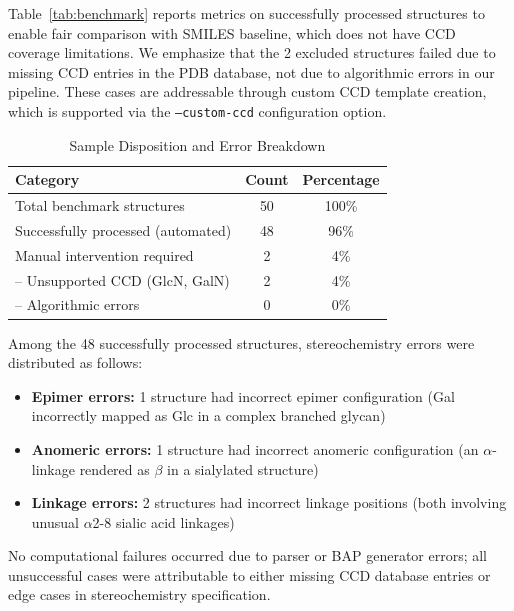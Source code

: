 Table~\ref{tab:benchmark} reports metrics on successfully processed structures to enable fair comparison with SMILES baseline, which does not have CCD coverage limitations. We emphasize that the 2 excluded structures failed due to missing CCD entries in the PDB database, not due to algorithmic errors in our pipeline. These cases are addressable through custom CCD template creation, which is supported via the \texttt{--custom-ccd} configuration option.

\begin{table}[htbp]
\centering
\caption{Sample Disposition and Error Breakdown}
\label{tab:disposition}
\begin{tabular}{lcc}
\toprule
Category & Count & Percentage \\
\midrule
Total benchmark structures & 50 & 100\% \\
Successfully processed (automated) & 48 & 96\% \\
Manual intervention required & 2 & 4\% \\
\quad -- Unsupported CCD (GlcN, GalN) & 2 & 4\% \\
\quad -- Algorithmic errors & 0 & 0\% \\
\bottomrule
\end{tabular}
\end{table}

Among the 48 successfully processed structures, stereochemistry errors were distributed as follows:
\begin{itemize}
\item \textbf{Epimer errors:} 1 structure had incorrect epimer configuration (Gal incorrectly mapped as Glc in a complex branched glycan)
\item \textbf{Anomeric errors:} 1 structure had incorrect anomeric configuration (an $\alpha$-linkage rendered as $\beta$ in a sialylated structure)
\item \textbf{Linkage errors:} 2 structures had incorrect linkage positions (both involving unusual $\alpha$2-8 sialic acid linkages)
\end{itemize}

No computational failures occurred due to parser or BAP generator errors; all unsuccessful cases were attributable to either missing CCD database entries or edge cases in stereochemistry specification.
